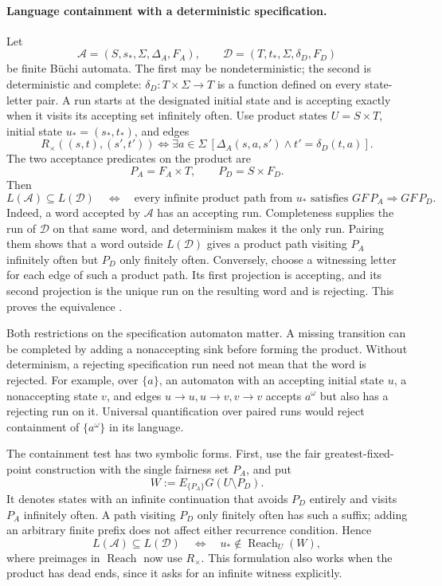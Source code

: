 \paragraph{Language containment with a deterministic specification.}
Let
\[
 \mathcal A=(S,s_*,\Sigma,\Delta_A,F_A),\qquad
 \mathcal D=(T,t_*,\Sigma,\delta_D,F_D)
\]
be finite B\"uchi automata. The first may be nondeterministic;
the second is deterministic and complete:
\(\delta_D:T\times\Sigma\to T\) is a function defined on every
state-letter pair. A run starts at the designated initial state
and is accepting exactly when it visits its accepting set
infinitely often. Use product states \(U=S\times T\), initial
state \(u_*=(s_*,t_*)\), and edges
\[
 R_\times((s,t),(s',t'))
   \iff\exists a\in\Sigma\
       [\Delta_A(s,a,s')\land t'=\delta_D(t,a)].
\]
The two acceptance predicates on the product are
\[
 P_A=F_A\times T,\qquad P_D=S\times F_D.
\]
Then
\[
 L(\mathcal A)\subseteq L(\mathcal D)
 \quad\Longleftrightarrow\quad
 \text{every infinite product path from }u_*
 \text{ satisfies }GF\,P_A\Rightarrow GF\,P_D.
\]
Indeed, a word accepted by \(\mathcal A\) has an accepting run.
Completeness supplies the run of \(\mathcal D\) on that same
word, and determinism makes it the only run. Pairing them shows
that a word outside \(L(\mathcal D)\) gives a product path visiting
\(P_A\) infinitely often but \(P_D\) only finitely often.
Conversely, choose a witnessing letter for each edge of such
a product path. Its first projection is accepting, and its
second projection is the unique run on the resulting word and
is rejecting. This proves the equivalence
\cite[\S9]{BurchEtAl1992}.

Both restrictions on the specification automaton matter. A missing
transition can be completed by adding a nonaccepting sink before
forming the product. Without determinism, a rejecting specification
run need not mean that the word is rejected. For example, over
\(\{a\}\), an automaton with an accepting initial state \(u\),
a nonaccepting state \(v\), and edges
\(u\to u,u\to v,v\to v\) accepts \(a^\omega\) but also has
a rejecting run on it. Universal quantification over paired runs
would reject containment of \(\{a^\omega\}\) in its language.

The containment test has two symbolic forms. First, use the fair
greatest-fixed-point construction with the single fairness set
\(P_A\), and put
\[
 W:=E_{\{P_A\}}G(U\setminus P_D).
\]
It denotes states with an infinite continuation that avoids
\(P_D\) entirely and visits \(P_A\) infinitely often. A path
visiting \(P_D\) only finitely often has such a suffix; adding
an arbitrary finite prefix does not affect either recurrence
condition. Hence
\[
 L(\mathcal A)\subseteq L(\mathcal D)
 \quad\Longleftrightarrow\quad
 u_*\notin\operatorname{Reach}_U(W),
\]
where preimages in \(\operatorname{Reach}\) now use \(R_\times\).
This formulation also works when the product has dead ends,
since it asks for an infinite witness explicitly.

